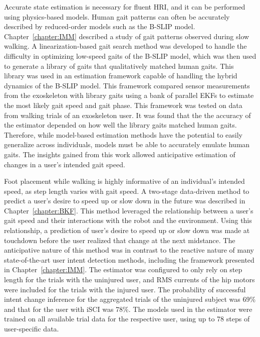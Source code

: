 Accurate state estimation is necessary for fluent HRI, and it can be performed using physics-based models. Human gait patterns can often be accurately described by reduced-order models such as the B-SLIP model. Chapter~\ref{chapter:IMM} described a study of gait patterns observed during slow walking. A linearization-based gait search method was developed to handle the difficulty in optimizing low-speed gaits of the B-SLIP model, which was then used to generate a library of gaits that qualitatively matched human gaits. This library was used in an estimation framework capable of handling the hybrid dynamics of the B-SLIP model. This framework compared sensor measurements from the exoskeleton with library gaits using a bank of parallel EKFs to estimate the most likely gait speed and gait phase. This framework was tested on data from walking trials of an exoskeleton user. It was found that the the accuracy of the estimator depended on how well the library gaits matched human gaits. Therefore, while model-based estimation methods have the potential to easily generalize across individuals, models must be able to accurately emulate human gaits. The insights gained from this work allowed anticipative estimation of changes in a user's intended gait speed.

Foot placement while walking is highly informative of an individual's intended speed, as step length varies with gait speed. A two-stage data-driven method to predict a user's desire to speed up or slow down in the future was described in Chapter~\ref{chapter:BKF}. This method leveraged the relationship between a user's gait speed and their interactions with the robot and the environment. Using this relationship, a prediction of user's desire to speed up or slow down was made at touchdown before the user realized that change at the next midstance. The anticipative nature of this method was in contrast to the reactive nature of many state-of-the-art user intent detection methods, including the framework presented in Chapter~\ref{chapter:IMM}. The estimator was configured to only rely on step length for the trials with the uninjured user, and RMS currents of the hip motors were included for the trials with the injured user. The probability of successful intent change inference for the aggregated trials of the uninjured subject was 69\% and that for the user with iSCI was 78\%. The models used in the estimator were trained on all available trial data for the respective user, using up to 78 steps of user-specific data.

